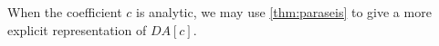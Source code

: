 \documentclass[
	fontsize=11pt, 
	twoside=false, 
	abstract=true, 
	a4paper,
]{scrartcl}
\newcommand{\eps}{\varepsilon}
\newcommand{\RR}{\mathbb{R}}
\newcommand{\dd}{\mathrm{d}}
\newcommand{\abs}[1]{\left\lvert#1\right\rvert}
\newcommand{\del}{\partial}
\begin{document}
When the coefficient $c$ is analytic, we may use \cref{thm:paraseis} to give a more explicit representation of $DA[c]$. 
\end{document}
